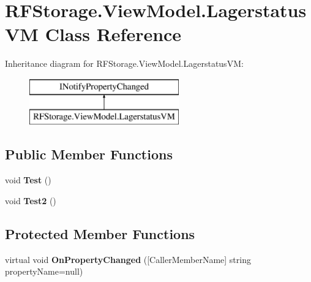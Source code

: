\section{R\+F\+Storage.\+View\+Model.\+Lagerstatus\+VM Class Reference}
\label{class_r_f_storage_1_1_view_model_1_1_lagerstatus_v_m}
Inheritance diagram for R\+F\+Storage.\+View\+Model.\+Lagerstatus\+VM\+:\begin{figure}[H]
\begin{center}
\leavevmode
\includegraphics[height=2.000000cm]{class_r_f_storage_1_1_view_model_1_1_lagerstatus_v_m}
\end{center}
\end{figure}
\subsection*{Public Member Functions}
\begin{DoxyCompactItemize}
\item 
\mbox{\label{class_r_f_storage_1_1_view_model_1_1_lagerstatus_v_m_a53b48537022d350bc85bdf0e62a8865d}} 
void {\bfseries Test} ()
\item 
\mbox{\label{class_r_f_storage_1_1_view_model_1_1_lagerstatus_v_m_a36941d14b908d21dd6940fc28a675690}} 
void {\bfseries Test2} ()
\end{DoxyCompactItemize}
\subsection*{Protected Member Functions}
\begin{DoxyCompactItemize}
\item 
\mbox{\label{class_r_f_storage_1_1_view_model_1_1_lagerstatus_v_m_af931ec8372de420c256ba042b98527d1}} 
virtual void {\bfseries On\+Property\+Changed} ([Caller\+Member\+Name] string property\+Name=null)
\end{DoxyCompactItemize}

